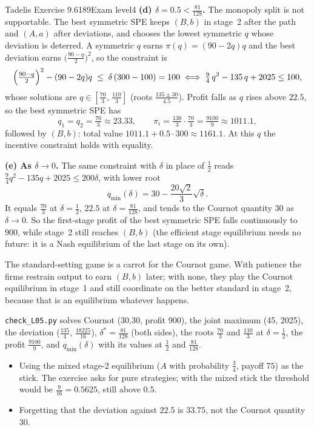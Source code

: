\begin{exsol}{Tadelis Exercise 9.6}{189}{Exam level}{4}
\textbf{(d) $\delta = 0.5 < \frac{81}{128}$.} The monopoly split is not supportable. The best symmetric SPE keeps
$(B,b)$ in stage~2 after the path and $(A,a)$ after deviations, and chooses the lowest symmetric $q$ whose
deviation is deterred. A symmetric $q$ earns $\pi(q) = (90 - 2q)q$ and the best deviation earns
$\bigl(\frac{90 - q}{2}\bigr)^2$, so the constraint is
\[
  \Bigl(\tfrac{90 - q}{2}\Bigr)^{2} - (90 - 2q)q \;\le\; \delta\,(300 - 100) = 100
  \iff \tfrac94\,q^2 - 135\,q + 2025 \le 100 ,
\]
whose solutions are $q \in [\frac{70}{3},\, \frac{110}{3}]$ (roots $\frac{135 \pm 30}{4.5}$). Profit falls as $q$
rises above $22.5$, so the best symmetric SPE has
\[
  q_1 = q_2 = \tfrac{70}{3} \approx 23.33, \qquad \pi_i = \tfrac{130}{3}\cdot\tfrac{70}{3} = \tfrac{9100}{9} \approx 1011.1,
\]
followed by $(B,b)$: total value $1011.1 + 0.5\cdot300 \approx 1161.1$. At this $q$ the incentive
constraint holds with equality.

\textbf{(e) As $\delta \to 0$.} The same constraint with $\delta$ in place of $\frac12$ reads
$\frac94q^2 - 135q + 2025 \le 200\delta$, with lower root
\[
  q_{\min}(\delta) = 30 - \frac{20\sqrt2}{3}\sqrt{\delta} .
\]
It equals $\frac{70}{3}$ at $\delta = \frac12$, $22.5$ at $\delta = \frac{81}{128}$, and tends to the Cournot quantity $30$
as $\delta \to 0$. So the first-stage profit of the best symmetric SPE falls continuously to $900$, while
stage~2 still reaches $(B,b)$ (the efficient stage equilibrium needs no future: it is a Nash equilibrium of
the last stage on its own).

\interp The standard-setting game is a carrot for the Cournot game. With patience the firms restrain
output to earn $(B,b)$ later; with none, they play the Cournot equilibrium in stage~1 and still coordinate
on the better standard in stage~2, because that is an equilibrium whatever happens.

\verify \texttt{check\_L05.py} solves Cournot (30,30, profit 900), the joint maximum (45, 2025), the
deviation ($\frac{135}{4}$, $\frac{18225}{16}$), $\delta^* = \frac{81}{128}$ (both sides), the roots $\frac{70}{3}$ and
$\frac{110}{3}$ at $\delta = \frac12$, the profit $\frac{9100}{9}$, and $q_{\min}(\delta)$ with its values at $\frac12$ and $\frac{81}{128}$.

\mistakes
\begin{itemize}
  \item Using the mixed stage-2 equilibrium ($A$ with probability $\frac34$, payoff $75$) as the stick. The
  exercise asks for pure strategies; with the mixed stick the threshold would be $\frac{9}{16} = 0.5625$,
  still above $0.5$.
  \item Forgetting that the deviation against $22.5$ is $33.75$, not the Cournot quantity $30$.
\end{itemize}


\end{exsol}

